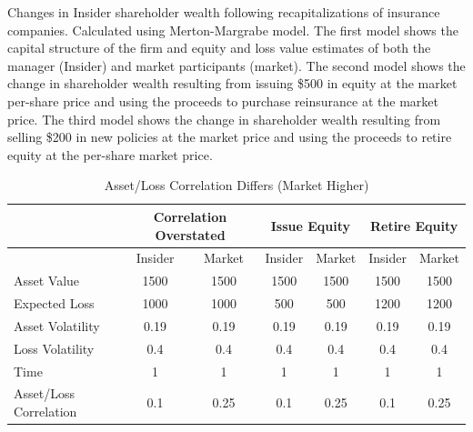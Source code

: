\begin{table}\caption{Asset/Loss Correlation Differs (Market Higher)\label{tab:corrover}}
\begin{small}Changes in Insider shareholder wealth following recapitalizations of insurance companies.  Calculated using Merton-Margrabe model.  The first model shows the capital structure of the firm and equity and loss value estimates of both the manager (Insider) and market participants (market).  The second model shows the change in shareholder wealth resulting from issuing \$500 in equity at the market per-share price and using the proceeds to purchase reinsurance at the market price.  The third model shows the change in shareholder wealth resulting from selling \$200 in new policies at the market price and using the proceeds to retire equity at the per-share market price.\end{small}
\begin{center}
\begin{tabular}{p{2in}cccccc}
\toprule
           & \multicolumn{ 2}{c}{Correlation Overstated} & \multicolumn{ 2}{c}{Issue Equity} & \multicolumn{ 2}{c}{Retire Equity} \\ 

\midrule
           &  Insider &     Market &  Insider &     Market &  Insider &     Market \\ 
           
\midrule
\midrule

Asset Value &       1500 &       1500 &       1500 &       1500 &       1500 &       1500 \\ 

Expected Loss &       1000 &       1000 &        500 &        500 &       1200 &       1200 \\ 

Asset Volatility &       0.19 &       0.19 &       0.19 &       0.19 &       0.19 &       0.19 \\ 

Loss Volatility &        0.4 &        0.4 &        0.4 &        0.4 &        0.4 &        0.4 \\ 

      Time &          1 &          1 &          1 &          1 &          1 &          1 \\ 

Asset/Loss Correlation &        0.1 &       0.25 &        0.1 &       0.25 &        0.1 &       0.25 \\ 


\end{tabular}
\end{center}
\end{table}
